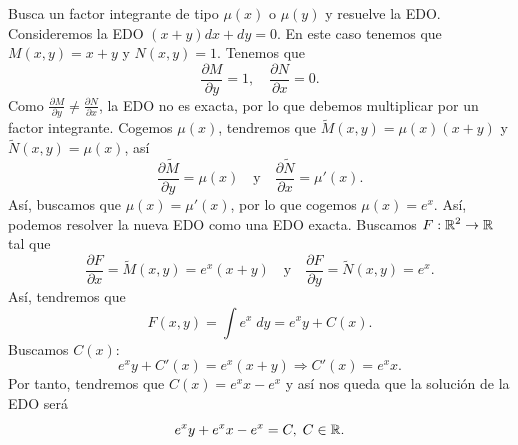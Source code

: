 \begin{eg}
Busca un factor integrante de tipo $\displaystyle \mu\left(x\right) $ o $\displaystyle \mu\left(y\right) $ y resuelve la EDO. Consideremos la EDO $\displaystyle \left(x + y\right)dx + dy = 0 $. En este caso tenemos que $\displaystyle M\left(x,y\right)=x + y $ y $\displaystyle N\left(x,y\right)= 1 $. Tenemos que 
	\[\frac{\partial M}{\partial y}= 1, \quad \frac{\partial N}{\partial x}= 0 .\]
	Como $\displaystyle \frac{\partial M}{\partial y}\neq \frac{\partial N}{\partial x} $, la EDO no es exacta, por lo que debemos multiplicar por un factor integrante. Cogemos $\displaystyle \mu\left(x\right) $, tendremos que $\displaystyle \widetilde{M}\left(x,y\right)=\mu\left(x\right)\left(x+y\right) $ y $\displaystyle \tilde{N}\left(x,y\right)=\mu\left(x\right) $, así 
	\[\frac{\partial \widetilde{M}}{\partial y} = \mu\left(x\right) \quad \text{y} \quad \frac{\partial \tilde{N}}{\partial x}=\mu'\left(x\right) .\]
Así, buscamos que $\displaystyle \mu\left(x\right)=\mu'\left(x\right) $, por lo que cogemos $\displaystyle \mu\left(x\right)= e^{x} $. Así, podemos resolver la nueva EDO como una EDO exacta. Buscamos $\displaystyle F : \mathbb{R} ^{2} \to \mathbb{R} $ tal que 
\[\frac{\partial F}{\partial x}= \widetilde{M}\left(x,y\right)=e^{x}\left(x+y\right) \quad \text{y} \quad \frac{\partial F}{\partial y}=\tilde{N}\left(x,y\right)=e^{x}.\]
Así, tendremos que 
\[F\left(x,y\right)=\int e^{x} \; dy = e^{x}y + C\left(x\right) .\]
Buscamos $\displaystyle C\left(x\right) $:
\[e^{x}y + C'\left(x\right)=e^{x}\left(x+y\right) \Rightarrow C'\left(x\right)=e^{x}x .\]
Por tanto, tendremos que $\displaystyle C\left(x\right)=e^{x}x-e^{x} $ y así nos queda que la solución de la EDO será
\[e^{x}y + e^{x}x - e^{x} = C, \; C \in \mathbb{R} .\]
\end{eg}
